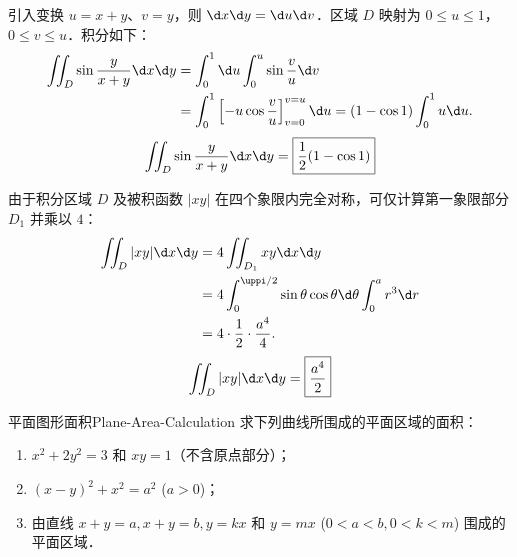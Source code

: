 \begin{solution}

    引入变换 $u = x+y$、$v = y$，则 $\d x \d y = \d u \d v$．区域 $D$ 映射为 $0 \le u \le 1$，$0 \le v \le u$．积分如下：
    \begin{equation}
        \begin{aligned}
            \iint_D \sin \frac{y}{x+y} \d x \d y & = \int_0^1 \d u \int_0^u \sin \frac{v}{u} \d v                                                 \\
                                                 & = \int_0^1 \left[ -u \cos \frac{v}{u} \right]_{v=0}^{v=u} \d u = (1 - \cos 1) \int_0^1 u \d u.
        \end{aligned}
    \end{equation}
    \begin{equation}
        \iint_D \sin \frac{y}{x+y} \d x \d y = \boxed{\frac{1}{2}(1 - \cos 1)}
    \end{equation}


    由于积分区域 $D$ 及被积函数 $|xy|$ 在四个象限内完全对称，可仅计算第一象限部分 $D_1$ 并乘以 $4$：
    \begin{equation}
        \begin{aligned}
            \iint_D |xy| \d x \d y & = 4 \iint_{D_1} xy \d x \d y                                                                   \\
                                   & = 4 \int_0^{\uppi/2} \sin \theta \cos \theta \d \theta \int_0^a r^3 \d r \label{eq:int-9-step} \\
                                   & = 4 \cdot \frac{1}{2} \cdot \frac{a^4}{4}.
        \end{aligned}
    \end{equation}
    \begin{equation}
        \iint_D |xy| \d x \d y = \boxed{\frac{a^4}{2}}
    \end{equation}
\end{solution}


\begin{problem}{平面图形面积}{Plane-Area-Calculation}
    求下列曲线所围成的平面区域的面积：
    \begin{enumerate}
        \item $x^2 + 2y^2 = 3$ 和 $xy = 1$（不含原点部分）；
        \item $(x - y)^2 + x^2 = a^2$ ($a > 0$)；
        \item 由直线 $x + y = a, x + y = b, y = kx$ 和 $y = m x$ ($0 < a < b, 0 < k < m$) 围成的平面区域．
    \end{enumerate}
\end{problem}

